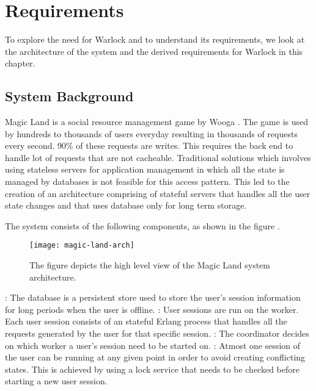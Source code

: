\chapter{Requirements}
\label{chapter:requirements}

To explore the need for
Warlock and to understand its requirements, we look at the architecture of
the system and the derived requirements for Warlock in this chapter.

\section{System Background}

Magic Land \citep{magicland} is a social%
resource management game by Wooga%
. The game is used by hundreds to thousands of users everyday resulting in
thousands of  requests every second. 90\% of these requests are
writes. This requires the back end to%
handle lot of requests that are not cacheable. Traditional solutions which
involves using stateless servers for application management in which all
the state is  managed
by databases is not feasible for this access pattern. This led to the creation
of an architecture comprising of stateful servers that handles all the user
state changes and that uses database only for long term storage.

The system consists of the following components, as shown in the figure
.

\begin{figure}
  \texttt{[image: magic-land-arch]}
  \caption[Magic Land Architecture]{%
    The figure depicts the high level view of the Magic Land system
    architecture.}
    \label{figure:magic.land.architecture}
  \normalcaption
\end{figure}

\begin{itemize}
    : The database is a persistent store used to store the
    user's session information for long periods when the user is offline.
    : User sessions are run on the worker. Each user session
    consists of an stateful Erlang process that handles all the requests
    generated by the user for that specific session.
    : The coordinator decides on which worker a user's
    session need to be started on.
    : Atmost one session of the user can be
    running at any given point in order to avoid creating conflicting states.
    This is achieved by using a lock service that needs to be checked before
    starting a new user session.
\end{itemize}

